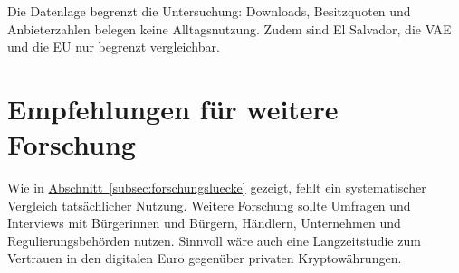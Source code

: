 Die Datenlage begrenzt die Untersuchung: Downloads, Besitzquoten und Anbieterzahlen belegen keine Alltagsnutzung. Zudem sind El Salvador, die VAE und die EU nur begrenzt vergleichbar.

\section{Empfehlungen für weitere Forschung}

Wie in \hyperref[subsec:forschungsluecke]{Abschnitt~\ref*{subsec:forschungsluecke}} gezeigt, fehlt ein systematischer Vergleich tatsächlicher Nutzung. Weitere Forschung sollte Umfragen und Interviews mit Bürgerinnen und Bürgern, Händlern, Unternehmen und Regulierungsbehörden nutzen. Sinnvoll wäre auch eine Langzeitstudie zum Vertrauen in den digitalen Euro gegenüber privaten Kryptowährungen.
